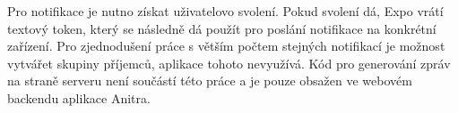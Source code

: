 Pro notifikace je nutno získat uživatelovo svolení. Pokud svolení dá, Expo vrátí textový token, který se následně dá použít pro poslání notifikace na konkrétní zařízení. Pro zjednodušení práce s větším počtem stejných notifikací je možnost vytvářet skupiny příjemců, aplikace tohoto nevyužívá. Kód pro generování zpráv na straně serveru není součástí této práce a je pouze obsažen ve webovém backendu aplikace Anitra.


